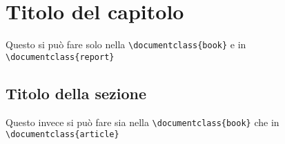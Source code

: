 \documentclass{book}
\begin{document}
    \chapter{Titolo del capitolo}
    Questo si pu\`o fare solo nella \verb!\documentclass{book}! e in 
    \verb!\documentclass{report}!
    \section{Titolo della sezione}
    Questo invece si pu\`o fare sia nella \verb!\documentclass{book}! che in 
    \verb!\documentclass{article}!
\end{document}
